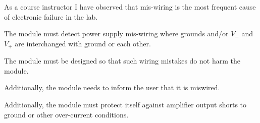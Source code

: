 As a course instructor I have observed that mis-wiring is the most frequent cause of electronic failure in the lab.
\bigskip

The module must detect power supply mis-wiring where grounds and/or $V_{-}$ 	and $V_{+}$ are interchanged with ground or each other.
\bigskip

The module must be designed so that such wiring mistakes do not harm the module.
\bigskip

Additionally, the module needs to inform the user that it is miswired.
\bigskip


Additionally, the module must protect itself against amplifier output shorts to ground or other over-current conditions.
\bigskip